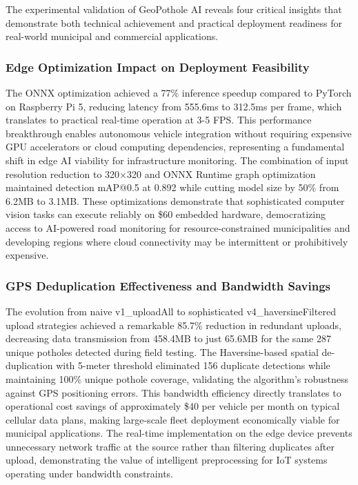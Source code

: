 \documentclass{ieeeaccess}
\begin{document}
The experimental validation of GeoPothole AI reveals four critical insights that demonstrate both technical achievement and practical deployment readiness for real-world municipal and commercial applications.

\subsubsection{Edge Optimization Impact on Deployment Feasibility}
The ONNX optimization achieved a 77\% inference speedup compared to PyTorch on Raspberry Pi 5, reducing latency from 555.6ms to 312.5ms per frame, which translates to practical real-time operation at 3-5 FPS. This performance breakthrough enables autonomous vehicle integration without requiring expensive GPU accelerators or cloud computing dependencies, representing a fundamental shift in edge AI viability for infrastructure monitoring. The combination of input resolution reduction to 320$\times$320 and ONNX Runtime graph optimization maintained detection mAP@0.5 at 0.892 while cutting model size by 50\% from 6.2MB to 3.1MB. These optimizations demonstrate that sophisticated computer vision tasks can execute reliably on \$60 embedded hardware, democratizing access to AI-powered road monitoring for resource-constrained municipalities and developing regions where cloud connectivity may be intermittent or prohibitively expensive.

\subsubsection{GPS Deduplication Effectiveness and Bandwidth Savings}
The evolution from naive v1\_uploadAll to sophisticated v4\_haversineFiltered upload strategies achieved a remarkable 85.7\% reduction in redundant uploads, decreasing data transmission from 458.4MB to just 65.6MB for the same 287 unique potholes detected during field testing. The Haversine-based spatial de-duplication with 5-meter threshold eliminated 156 duplicate detections while maintaining 100\% unique pothole coverage, validating the algorithm's robustness against GPS positioning errors. This bandwidth efficiency directly translates to operational cost savings of approximately \$40 per vehicle per month on typical cellular data plans, making large-scale fleet deployment economically viable for municipal applications. The real-time implementation on the edge device prevents unnecessary network traffic at the source rather than filtering duplicates after upload, demonstrating the value of intelligent preprocessing for IoT systems operating under bandwidth constraints.
\end{document}
